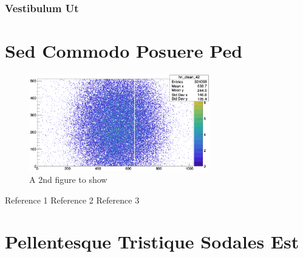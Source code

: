 \documentclass[doctor, english]{pnuthesis}
\begin{document}
\subsection{Vestibulum Ut}
\lipsum[7]

\chapter{Sed Commodo Posuere Ped}
\lipsum[8-9]
\begin{figure}[!h]
	\centering
	\includegraphics[width=0.7\textwidth]{samples/samplefig2.png}
	\caption{A 2nd figure to show}
\end{figure}
\lipsum[9-10]

%
%

\begin{thebibliography}{00}
	 Reference 1
	 Reference 2
	 Reference 3
\end{thebibliography}


\appendix
\chapter{Pellentesque Tristique Sodales Est}
\lipsum[12-14]

\pagebreak
\acknowledgement %

\lipsum[1-7]
\end{document}
